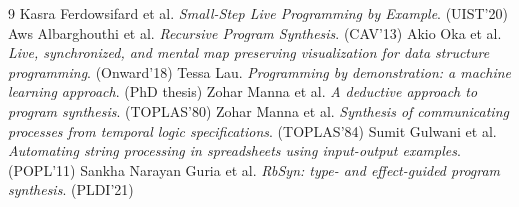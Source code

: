 \documentclass[11pt, a4paper, oneside, twocolumn]{jsarticle}
\begin{document}
{\scriptsize
\begin{thebibliography}{9} 
  Kasra Ferdowsifard et al. \emph{Small-Step Live Programming by Example}. (UIST'20) %
  Aws Albarghouthi et al. \emph{Recursive Program Synthesis}. (CAV'13)%
  Akio Oka et al. \emph{Live, synchronized, and mental map preserving visualization for data structure programming}. (Onward'18) %
  Tessa Lau. \emph{Programming by demonstration: a machine learning approach}. (PhD thesis)
  Zohar Manna et al. \emph{A deductive approach to program synthesis}.  (TOPLAS'80) %
  Zohar Manna et al. \emph{Synthesis of communicating processes from temporal logic specifications}. (TOPLAS'84) %
  Sumit Gulwani et al. \emph{Automating string processing in spreadsheets using input-output examples}. (POPL'11) %
  Sankha Narayan Guria et al. \emph{RbSyn: type- and effect-guided program synthesis}. (PLDI'21) %
\end{thebibliography}
}

% 
\end{document}
